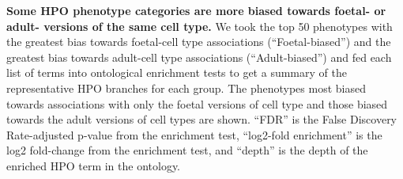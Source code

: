 \documentclass[
]{article}
\begin{document}
\begin{table}

\caption{\label{tbl-hpo_enrich}\textbf{Some HPO phenotype categories are
more biased towards foetal- or adult- versions of the same cell type.}
We took the top 50 phenotypes with the greatest bias towards foetal-cell
type associations (``Foetal-biased'') and the greatest bias towards
adult-cell type associations (``Adult-biased'') and fed each list of
terms into ontological enrichment tests to get a summary of the
representative HPO branches for each group. The phenotypes most biased
towards associations with only the foetal versions of cell type and
those biased towards the adult versions of cell types are shown. ``FDR''
is the False Discovery Rate-adjusted p-value from the enrichment test,
``log2-fold enrichment'' is the log2 fold-change from the enrichment
test, and ``depth'' is the depth of the enriched HPO term in the
ontology.}

\centering{

}
\end{table}
\end{document}
